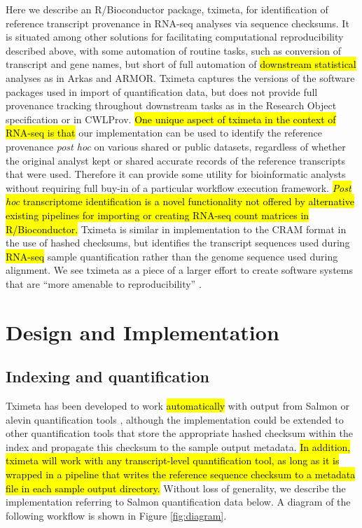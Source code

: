 Here we describe an R/Bioconductor package, tximeta, for
identification of reference transcript provenance in RNA-seq analyses
via sequence checksums. It is situated among other solutions for
facilitating computational reproducibility described above, with some
automation of routine tasks, such as conversion of transcript and gene
names, but short of full automation of \hl{downstream statistical} analyses
as in Arkas and ARMOR. Tximeta captures the versions of the software
packages used in import of quantification data, but does not provide
full provenance tracking throughout downstream tasks as in the
Research Object specification or in CWLProv. \hl{One unique aspect of
tximeta in the context of RNA-seq is that} our implementation can be
used to identify the reference provenance
\textit{post hoc} on various shared or public datasets, regardless of
whether the original analyst kept or shared accurate records of the
reference transcripts that were used. Therefore it can provide some
utility for bioinformatic analysts without requiring full buy-in of a
particular workflow execution framework.
\hl{\textit{Post hoc} transcriptome identification is a novel
functionality not offered by alternative existing pipelines for
importing or creating RNA-seq count matrices in R/Bioconductor.}
Tximeta is similar in implementation to the CRAM format in the use of
hashed checksums, but identifies the transcript sequences used during
\hl{RNA-seq} sample quantification rather than the genome sequence
used during alignment. We see tximeta as a piece of a larger effort to
create software systems that are ``more amenable to reproducibility''
\cite{Peng2011}.

\section*{Design and Implementation}

\subsection*{Indexing and quantification}

Tximeta has been developed to work \hl{automatically} with output from
Salmon or alevin quantification tools \cite{salmon,alevin},
although the implementation could be extended to other quantification
tools that store the appropriate hashed checksum within the index and
propagate this checksum to the sample output metadata.
\hl{In addition, tximeta will work with any transcript-level
quantification tool, as long as it is wrapped in a pipeline that
writes the reference sequence checksum to a metadata file in each
sample output directory.} Without loss of generality, we
describe the implementation referring to Salmon quantification data
below. A diagram of the following workflow is shown in Figure
\ref{fig:diagram}. 

